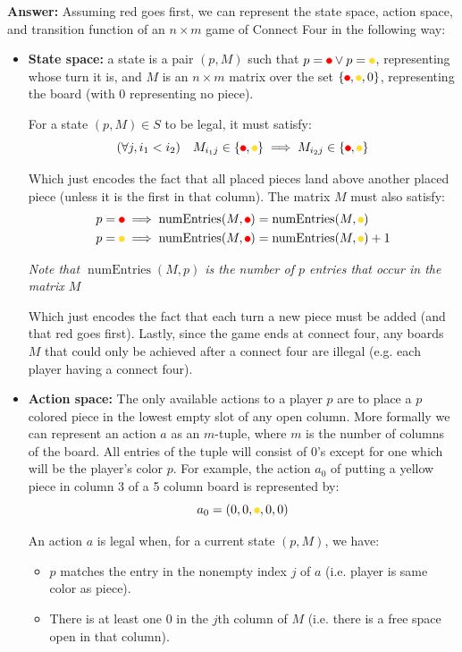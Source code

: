 \documentclass{article}
\begin{document}
\noindent\textbf{Answer:} Assuming red goes first, we can represent the state space, action space, and transition function of an $n\times m$ game of Connect Four in the following way:
\begin{itemize}
  \item \textbf{State space:} a state is a pair $(p,M)$ such that $p=\re\vee p=\ye$, representing whose turn it is, and $M$ is an $n\times m$ matrix over the set $\{\re,\ye,0\}$, representing the board (with $0$ representing no piece).
  
  For a state $(p,M)\in S$ to be legal, it must satisfy:
  $$(\forall j, i_1<i_2)\quad M_{i_1j}\in\{\re,\ye\}\implies M_{i_2j}\in\{\re,\ye\}$$

  Which just encodes the fact that all placed pieces land above another placed piece (unless it is the first in that column). The matrix $M$ must also satisfy:
  \begin{align*}
    p=\re\implies\operatorname{numEntries}(M,\re)&=\operatorname{numEntries}(M,\ye)\\
    p=\ye\implies\operatorname{numEntries}(M,\re)&=\operatorname{numEntries}(M,\ye)+1
  \end{align*}
  
  \textit{Note that $\operatorname{numEntries}(M,p)$ is the number of $p$ entries that occur in the matrix $M$}
  \smallskip

  Which just encodes the fact that each turn a new piece must be added (and that red goes first). Lastly, since the game ends at connect four, any boards $M$ that could only be achieved after a connect four are illegal (e.g. each player having a connect four).

	\item \textbf{Action space:} The only available actions to a player $p$ are to place a $p$ colored piece in the lowest empty slot of any open column. More formally we can represent an action $a$ as an $m$-tuple, where $m$ is the number of columns of the board. All entries of the tuple will consist of 0's except for one which will be the player's color $p$. For example, the action $a_0$ of putting a yellow piece in column 3 of a 5 column board is represented by:
  $$a_0=(0,0,\ye,0,0)$$

  An action $a$ is legal when, for a current state $(p,M)$, we have:
  \begin{itemize}
    \item $p$ matches the entry in the nonempty index $j$ of $a$ (i.e. player is same color as piece).
    \item There is at least one 0 in the $j$th column of $M$ (i.e. there is a free space open in that column).
  \end{itemize}


\end{itemize}
\end{document}
